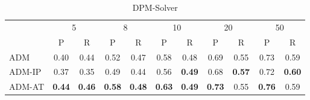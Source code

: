\begin{table}[!t]
\begin{subtable}[h]{\textwidth}
{\begin{tabular}{l c c c c c c c c c c}
        \toprule
         & \multicolumn{2}{c}{5} & \multicolumn{2}{c}{8} & \multicolumn{2}{c}{10} & \multicolumn{2}{c}{20} & \multicolumn{2}{c}{50} \\
         & P & R & P & R & P & R & P & R & P & R\\
        \midrule
         ADM & 0.40 & 0.44 & 0.52 & 0.47 & 0.58 & 0.48 & 0.69 & 0.55 & 0.73 & 0.59 \\
         ADM-IP & 0.37  & 0.35 & 0.49 & 0.44 & 0.56 & \bf 0.49 & 0.68 & \bf 0.57 & 0.72 & \bf 0.60 \\
         ADM-AT & \bf 0.44 & \bf 0.46 & \bf 0.58 & \bf 0.48 & \bf 0.63 & \bf 0.49 & \bf 0.73 & 0.55 & \bf 0.76 & 0.59 \\
        \bottomrule
       \end{tabular}
       }
    \end{subtable}
    \begin{subtable}[h]{\textwidth}
        \centering
        \caption{DPM-Solver}
    \end{subtable}
    \label{tab:pr_i64}
\end{table}